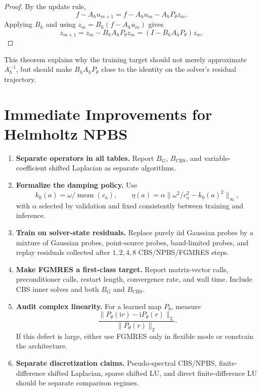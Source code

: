 \documentclass[11pt]{article}
\newcommand{\ii}{\mathrm{i}}
\begin{document}
\begin{proof}
By the update rule,
\[
  f-A_h u_{m+1}
  =
  f-A_h u_m - A_h P_\theta z_m .
\]
Applying \(B_h\) and using \(z_m=B_h(f-A_hu_m)\) gives
\[
  z_{m+1}
  =
  z_m - B_h A_h P_\theta z_m
  =
  (I-B_hA_hP_\theta)z_m.
\]
\end{proof}

This theorem explains why the training target should not merely approximate
\(A_h^{-1}\), but should make \(B_h A_h P_\theta\) close to the identity on the
solver's residual trajectory.

\section{Immediate Improvements for Helmholtz NPBS}

\begin{enumerate}
\item \textbf{Separate operators in all tables.}
Report \(B_G\), \(B_{\mathrm{CBS}}\), and variable-coefficient shifted
Laplacian as separate algorithms.

\item \textbf{Formalize the damping policy.}
Use
\[
  k_0(a)=\omega/\operatorname{mean}(c_a), \qquad
  \eta(a)=\alpha\|\omega^2/c_a^2-k_0(a)^2\|_\infty,
\]
with \(\alpha\) selected by validation and fixed consistently between training
and inference.

\item \textbf{Train on solver-state residuals.}
Replace purely iid Gaussian probes by a mixture of Gaussian probes, point-source
probes, band-limited probes, and replay residuals collected after
\(1,2,4,8\) CBS/NPBS/FGMRES steps.

\item \textbf{Make FGMRES a first-class target.}
Report matrix-vector calls, preconditioner calls, restart length, convergence
rate, and wall time. Include CBS inner solves and both \(B_G\) and
\(B_{\mathrm{CBS}}\).

\item \textbf{Audit complex linearity.}
For a learned map \(P_\theta\), measure
\[
  \frac{\|P_\theta(\ii r)-\ii P_\theta(r)\|_2}{\|P_\theta(r)\|_2}.
\]
If this defect is large, either use FGMRES only in flexible mode or constrain
the architecture.

\item \textbf{Separate discretization claims.}
Pseudo-spectral CBS/NPBS, finite-difference shifted Laplacian, sparse shifted
LU, and direct finite-difference LU should be separate comparison regimes.
\end{enumerate}
\end{document}
